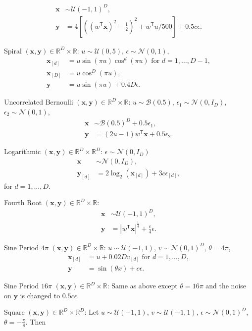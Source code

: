 \documentclass[11pt]{article}
\providecommand{\mb}[1]{\boldsymbol{#1}}
\providecommand{\mc}[1]{\mathcal{#1}}
\newcommand{\Real}{\mathbb{R}}
\newcommand{\T}{^{\ensuremath{\mathsf{T}}}}           %
\begin{document}
\begin{compactenum}
\begin{align*}
\mb{x} &\sim \mc{U}(-1,1)^{D},\\
\mb{y}&=4\left[ \left( (w\T \mb{x})^2 - \tfrac{1}{2} \right)^2 + w\T u/500 \right]+0.5c\epsilon.
\end{align*}
\item Spiral $(\mb{x},\mb{y}) \in \Real^{D} \times \Real$: $u \sim \mc{U}(0,5)$, $\epsilon \sim \mc{N}(0, 1)$,
\begin{align*}
\mb{x}_{[d]}&=u \sin(\pi u)  \cos^{d}(\pi u) \mbox{ for $d=1,\ldots,D-1$},\\
\mb{x}_{[D]}&=u \cos^{D}(\pi u),\\
\mb{y}&= u \sin(\pi u) +0.4 D\epsilon.
\end{align*}
\item Uncorrelated Bernoulli $(\mb{x},\mb{y}) \in \Real^{D} \times \Real$: $u \sim \mc{B}(0.5)$, $\epsilon_{1} \sim \mc{N}(0, I_{D})$, $\epsilon_{2} \sim \mc{N}(0, 1)$,
\begin{align*}
\mb{x} &\sim \mc{B}(0.5)^{D}+0.5\epsilon_{1},\\
\mb{y}&=(2u-1)w\T \mb{x}+0.5\epsilon_{2}.
\end{align*}
\item Logarithmic $(\mb{x},\mb{y}) \in \Real^{D} \times \Real^{D}$: $\epsilon \sim \mc{N}(0, I_{D})$
\begin{align*}
\mb{x} &\sim \mc{N}(0, I_{D}),\\
\mb{y}_{[d]}&=2\log_{2}(\mb{x}_{[d]})+3c\epsilon_{[d]},
\end{align*}
for $d=1,\ldots,D$.
\item Fourth Root $(\mb{x},\mb{y}) \in \Real^{D} \times \Real$:
\begin{align*}
\mb{x} &\sim \mc{U}(-1,1)^{D},\\
\mb{y}&=|w\T \mb{x}|^\frac{1}{4}+\frac{c}{4}\epsilon.
\end{align*}
\item Sine Period $4\pi$ $(\mb{x},\mb{y}) \in \Real^{D} \times \Real$: $u \sim \mc{U}(-1,1)$, $v \sim \mc{N}(0,1)^{D}$, $\theta=4\pi$,
\begin{align*}
\mb{x}_{[d]}&=u+0.02 D v_{[d]} \mbox{ for $d=1,\ldots,D$}, \\
\mb{y}&=\sin ( \theta x )+c\epsilon.
\end{align*}
\item Sine Period $16\pi$ $(\mb{x},\mb{y}) \in \Real^{D} \times \Real$: Same as above except $\theta=16\pi$ and the noise on $\mb{y}$ is changed to $0.5c\epsilon$.
\item Square $(\mb{x},\mb{y}) \in \Real^{D} \times \Real^{D}$: Let $u \sim \mc{U}(-1,1)$, $v \sim \mc{U}(-1,1)$, $\epsilon \sim \mc{N}(0,1)^{D}$, $\theta=-\frac{\pi}{8}$. Then

\end{compactenum}
\end{document}
